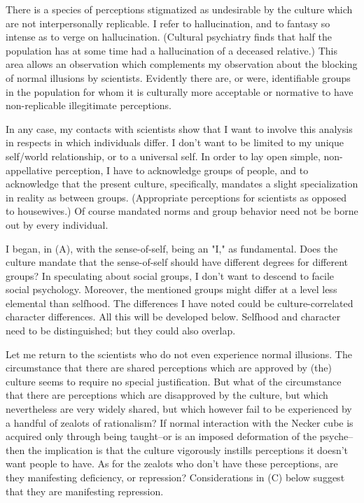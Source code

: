 There is a species of perceptions stigmatized as undesirable by the culture which are not interpersonally replicable. I refer to hallucination, and to fantasy so intense as to verge on hallucination. (Cultural psychiatry finds that half the population has at some time had a hallucination of a deceased relative.) This area allows an observation which complements my observation about the blocking of normal illusions by scientists. Evidently there are, or were, identifiable groups in the population for whom it is culturally more acceptable or normative to have non-replicable illegitimate perceptions.

In any case, my contacts with scientists show that I want to involve this analysis in respects in which individuals differ. I don't want to be limited to my unique self/world relationship, or to a universal self. In order to lay open simple, non-appellative perception, I have to acknowledge groups of people, and to acknowledge that the present culture, specifically, mandates a slight specialization in reality as between groups. (Appropriate perceptions for scientists as opposed to housewives.) Of course mandated norms and group behavior need not be borne out by every individual.

I began, in (A), with the sense-of-self, being an "I," as fundamental. Does the culture mandate that the sense-of-self should have different degrees for different groups? In speculating about social groups, I don't want to descend to facile social psychology. Moreover, the mentioned groups might differ at a level less elemental than selfhood. The differences I have noted could be culture-correlated character differences. All this will be developed below. Selfhood and character need to be distinguished; but they could also overlap.

Let me return to the scientists who do not even experience normal illusions. The circumstance that there are shared perceptions which are approved by (the) culture seems to require no special justification. But what of the circumstance that there are perceptions which are disapproved by the culture, but which nevertheless are very widely shared, but which however fail to be experienced by a handful of zealots of rationalism? If normal interaction with the Necker cube is acquired only through being taught--or is an imposed deformation of the psyche--then the implication is that the culture vigorously instills perceptions it doesn't want people to have. As for the zealots who don't have these perceptions, are they manifesting deficiency, or repression? Considerations in (C) below suggest that they are manifesting repression.

